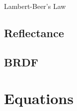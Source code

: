 \documentclass{article}
\begin{document}
Lambert-Beer's Law 



\subsection{Reflectance}

\subsection{BRDF}







\section{Equations}



\end{document}
